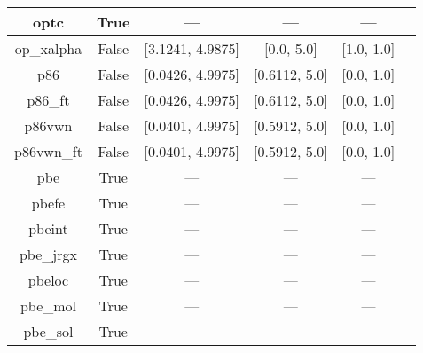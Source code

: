 \begin{tabular}{|c|c|c|c|c|l|}
           optc &                  True &               --- &               --- &               --- &                                            \cite{Cohen2001_607} \\ \hline
     op\_xalpha &                 False &  [3.1241, 4.9875] &        [0.0, 5.0] &        [1.0, 1.0] &                       \cite{Tsuneda1999_10664,Tsuneda1999_5656} \\ \hline
            p86 &                 False &  [0.0426, 4.9975] &     [0.6112, 5.0] &        [0.0, 1.0] &                                          \cite{Perdew1986_8822} \\ \hline
        p86\_ft &                 False &  [0.0426, 4.9975] &     [0.6112, 5.0] &        [0.0, 1.0] &                                          \cite{Perdew1986_8822} \\ \hline
         p86vwn &                 False &  [0.0401, 4.9975] &     [0.5912, 5.0] &        [0.0, 1.0] &                                          \cite{Perdew1986_8822} \\ \hline
     p86vwn\_ft &                 False &  [0.0401, 4.9975] &     [0.5912, 5.0] &        [0.0, 1.0] &                                          \cite{Perdew1986_8822} \\ \hline
            pbe &                  True &               --- &               --- &               --- &                      \cite{Perdew1996_3865,Perdew1996_3865_err} \\ \hline
          pbefe &                  True &               --- &               --- &               --- &                                           \cite{Perez2015_3844} \\ \hline
         pbeint &                  True &               --- &               --- &               --- &                                       \cite{Fabiano2010_113104} \\ \hline
      pbe\_jrgx &                  True &               --- &               --- &               --- &                                       \cite{Pedroza2009_201106} \\ \hline
         pbeloc &                  True &               --- &               --- &               --- &                                    \cite{Constantin2012_035130} \\ \hline
       pbe\_mol &                  True &               --- &               --- &               --- &                                      \cite{delCampo2012_104108} \\ \hline
       pbe\_sol &                  True &               --- &               --- &               --- &                                        \cite{Perdew2008_136406} \\ \hline

\end{tabular}
